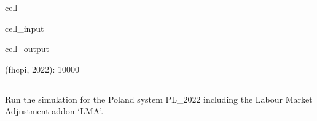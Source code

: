 \documentclass[letterpaper,10pt,english]{sphinxmanual}
\begin{document}
\begin{sphinxuseclass}{cell}
\begin{sphinxuseclass}{cell_input}
\begin{sphinxVerbatim}[commandchars=\\\{\}]
\end{sphinxVerbatim}

\end{sphinxuseclass}
\begin{sphinxuseclass}{cell_output}
\begin{sphinxVerbatim}[commandchars=\\\{\}]
\PYGZob{}(\PYGZsq{}\PYGZdl{}f\PYGZus{}h\PYGZus{}cpi\PYGZsq{}, \PYGZsq{}2022\PYGZsq{}): \PYGZsq{}10000\PYGZsq{}\PYGZcb{}
\end{sphinxVerbatim}

\end{sphinxuseclass}
\end{sphinxuseclass}

\subsection{}
\label{\detokenize{example:run-with-add-ons}}
\sphinxAtStartPar
Run the simulation for the Poland system PL\_2022 including the Labour Market Adjustment add\sphinxhyphen{}on ‘LMA’.
\end{document}
